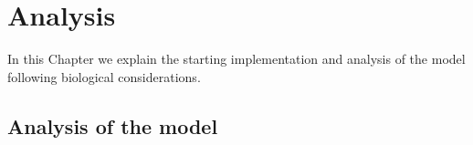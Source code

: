 \chapter{Analysis}\label{analysis}
\lhead[\fancyplain{}{\bfseries\thepage}]{\fancyplain{}{\bfseries\rightmark}}

In this Chapter we explain the starting implementation and analysis of the model following biological considerations.
\section{Analysis of the model}
